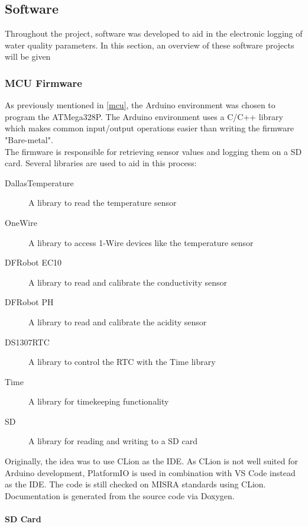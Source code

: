 \newpage
\subsection{Software}
Throughout the project, software was developed to aid in the electronic logging of water quality parameters. In this section, an overview of these software projects will be given

\subsubsection{MCU Firmware}
As previously mentioned in \ref{mcu}, the Arduino environment was chosen to program the ATMega328P. The Arduino environment uses a C/C++ library which makes common input/output operations easier than writing the firmware "Bare-metal".\\

The firmware \cite{rwsuufirmware} is responsible for retrieving sensor values and logging them on a \gls{SD} card. Several libraries are used to aid in this process:

\begin{description}
   \item[DallasTemperature \cite{Dallas}] A library to read the temperature sensor
   \item[OneWire] \cite{OneWire} A library to access 1-Wire devices like the temperature sensor
   \item[DFRobot EC10] \cite{ec10} A library to read and calibrate the conductivity sensor
   \item[DFRobot PH] \cite{phlibrary} A library to read and calibrate the acidity sensor
   \item[DS1307RTC] \cite{DS1307RTC} A library to control the \gls{RTC} with the Time library
   \item[Time] \cite{timelibrary} A library for timekeeping functionality
   \item[SD] \cite{sdlibrary} A library for reading and writing to a SD card
\end{description}

Originally, the idea was to use CLion as the \gls{IDE}. As CLion is not well suited for Arduino development, PlatformIO \cite{platformio} is used in combination with VS Code instead as the \gls{IDE}. The code is still checked on MISRA standards using CLion. Documentation is generated from the source code via Doxygen. \cite{doxygen}
\newpage
\paragraph{SD Card} \label{sd}

